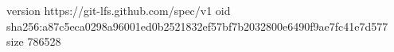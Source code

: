 version https://git-lfs.github.com/spec/v1
oid sha256:a87c5eca0298a96001ed0b2521832ef57bf7b2032800e6490f9ae7fc41e7d577
size 786528
